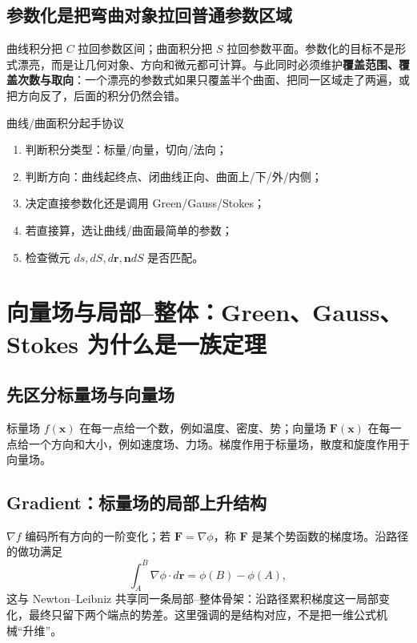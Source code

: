 \documentclass[11pt,a4paper,openany]{ctexbook}
\newcommand{\key}[1]{\textbf{\color{deep}#1}}
\begin{document}
\section{参数化是把弯曲对象拉回普通参数区域}
曲线积分把 $C$ 拉回参数区间；曲面积分把 $S$ 拉回参数平面。参数化的目标不是形式漂亮，而是让几何对象、方向和微元都可计算。与此同时必须维护\key{覆盖范围、覆盖次数与取向}：一个漂亮的参数式如果只覆盖半个曲面、把同一区域走了两遍，或把方向反了，后面的积分仍然会错。

\begin{methodbox}{曲线/曲面积分起手协议}
\begin{enumerate}
  \item 判断积分类型：标量/向量，切向/法向；
  \item 判断方向：曲线起终点、闭曲线正向、曲面上/下/外/内侧；
  \item 决定直接参数化还是调用 Green/Gauss/Stokes；
  \item 若直接算，选让曲线/曲面最简单的参数；
  \item 检查微元 $ds,dS,d\bm r,\bm n dS$ 是否匹配。
\end{enumerate}
\end{methodbox}

\chapter{向量场与局部--整体：Green、Gauss、Stokes 为什么是一族定理}

\section{先区分标量场与向量场}
标量场 $f(\bm x)$ 在每一点给一个数，例如温度、密度、势；向量场 $\bm F(\bm x)$ 在每一点给一个方向和大小，例如速度场、力场。梯度作用于标量场，散度和旋度作用于向量场。

\section{Gradient：标量场的局部上升结构}
$\nabla f$ 编码所有方向的一阶变化；若 $\bm F=\nabla\phi$，称 $\bm F$ 是某个势函数的梯度场。沿路径的做功满足
\[
\int_A^B \nabla\phi\cdot d\bm r=\phi(B)-\phi(A),
\]
这与 Newton--Leibniz 共享同一条局部--整体骨架：沿路径累积梯度这一局部变化，最终只留下两个端点的势差。这里强调的是结构对应，不是把一维公式机械“升维”。
\end{document}
